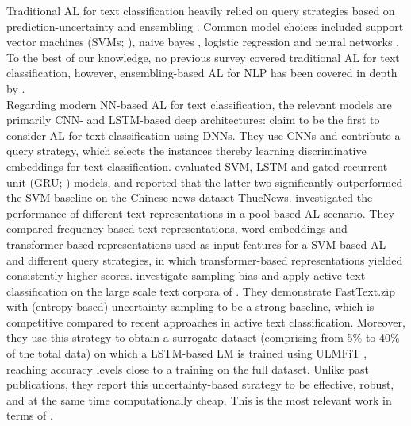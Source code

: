 \label{subsect:active_tc} 
Traditional AL for text classification heavily relied on query strategies based on prediction-uncertainty  and ensembling . 
Common model choices included support vector machines (SVMs; ), naive bayes , logistic regression  and neural networks .
To the best of our knowledge, no previous survey covered traditional AL for text classification, however,  ensembling-based AL for NLP has been covered in depth by \textcite{olsson2009literature}.\\
\pindent Regarding modern NN-based AL for text classification, the relevant models are primarily CNN- and LSTM-based deep architectures: \textcite{zhang2017active} claim to be the first to consider AL for text classification using DNNs.
They use CNNs and contribute a query strategy, which selects the instances  thereby learning discriminative embeddings for text classification.
\textcite{an2018deep} evaluated SVM, LSTM and gated recurrent unit (GRU; \textcite{cho2014properties}) models, and reported that the latter two significantly outperformed the SVM baseline on the Chinese news dataset ThucNews.
\textcite{lu2020investigating} investigated the performance of different text representations in a pool-based AL scenario.
They compared frequency-based text representations, word embeddings and transformer-based representations used as input features for a SVM-based AL and different query strategies,
in which transformer-based representations yielded consistently higher scores.
\textcite{prabhu2019sampling} investigate sampling bias and apply active text classification on the large scale text corpora of \textcite{zhang2016character-level}.
They demonstrate FastText.zip  with (entropy-based) uncertainty sampling to be a strong baseline, which is competitive compared to recent approaches in active text classification.
Moreover, they use this strategy to obtain a surrogate dataset (comprising from 5\% to 40\% of the total data) on which a LSTM-based LM is trained using ULMFiT , reaching accuracy levels close to a training on the full dataset.
Unlike past publications, they report this uncertainty-based strategy to be effective, robust, and at the same time computationally cheap.
This is the most relevant work in terms of .
